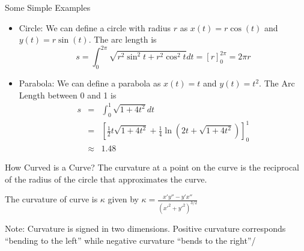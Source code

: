 \documentclass{beamer}
\begin{document}
\begin{frame}{Some Simple Examples}
\begin{itemize}
	
	\item Circle: We can define a circle with radius $r$ as $x(t)=r \cos(t)$ and $y(t)= r \sin(t)$. The arc length is 
	\[
	s = \int_{0}^{2 \pi} \sqrt{r^2 \sin^2 t + r^2 \cos^2 t}dt = \left[r \right]_{0}^{2 \pi} = 2 \pi r
	\]
	
	\item Parabola: We can define a parabola as $x(t)=t$ and $y(t)=t^2$. The Arc Length between 0 and 1 is 
	\begin{eqnarray*}
	s &=& \int_{0}^{1} \sqrt{1+4t^2}dt \\ &=& \left[\frac{1}{2} t\sqrt{1+ 4 t^2} +\frac{1}{4} \ln \left(2 t+\sqrt{1+ 4 t^2} \right) \right]_{0}^1 \\
	&\approx&	 1.48
	\end{eqnarray*}
\end{itemize}

\end{frame}

\begin{frame}{How Curved is a Curve?}
	The curvature at a point on the curve is the reciprocal of the radius of the circle that approximates the curve.
	\begin{definition}[Curvature]
		The curvature of curve is $\kappa$ given by
		$\kappa=\frac{x' y'' - y' x''}{(x'^2+y'^2)^{3/2}}$
	\end{definition}
	Note: Curvature is signed in two dimensions. Positive curvature corresponds ``bending to the left'' while negative curvature ``bends to the right''/ 
\end{frame}
\end{document}
